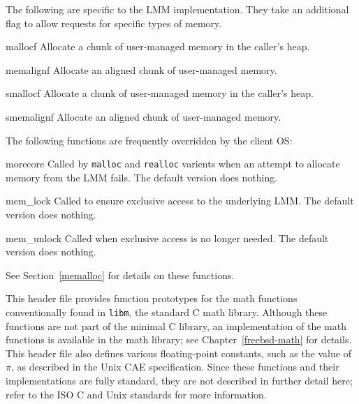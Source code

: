 \begin{apidesc}
	The following are specific to the LMM implementation.  They take an
	additional flag to allow requests for specific types of memory.

	\begin{csymlist}
		\item[mallocf]
			Allocate a chunk of user-managed memory in the
			caller's heap.
		\item[memalignf]
			Allocate an aligned chunk of user-managed memory.
		\item[smallocf]
			Allocate a chunk of user-managed memory in the
			caller's heap.
		\item[smemalignf]
			Allocate an aligned chunk of user-managed memory.
	\end{csymlist}

	The following functions are frequently overridden by the client OS:

	\begin{csymlist}
		\item[morecore]
			Called by \texttt{malloc} and \texttt{realloc}
			varients when an attempt to allocate memory from
			the LMM fails.
			The default version does nothing.
		\item[mem_lock]
			Called to ensure exclusive access to the
			underlying LMM\@.
			The default version does nothing.
		\item[mem_unlock]
			Called when exclusive access is no longer needed.
			The default version does nothing.
	\end{csymlist}

	See Section~\ref{memalloc} for details on these functions.
\end{apidesc}

\begin{apidesc}
	This header file provides function prototypes
	for the math functions conventionally found in \texttt{libm},
	the standard C math library.
	Although these functions are not part of the minimal C library,
	an implementation of the math functions is available
	in the \freebsd{} math library;
	see Chapter~\ref{freebsd-math} for details.
	This header file also defines various floating-point constants,
	such as the value of $\pi$,
	as described in the Unix CAE specification.
	Since these functions and their implementations are fully standard,
	they are not described in further detail here;
	refer to the ISO C and Unix standards for more information.
\end{apidesc}

